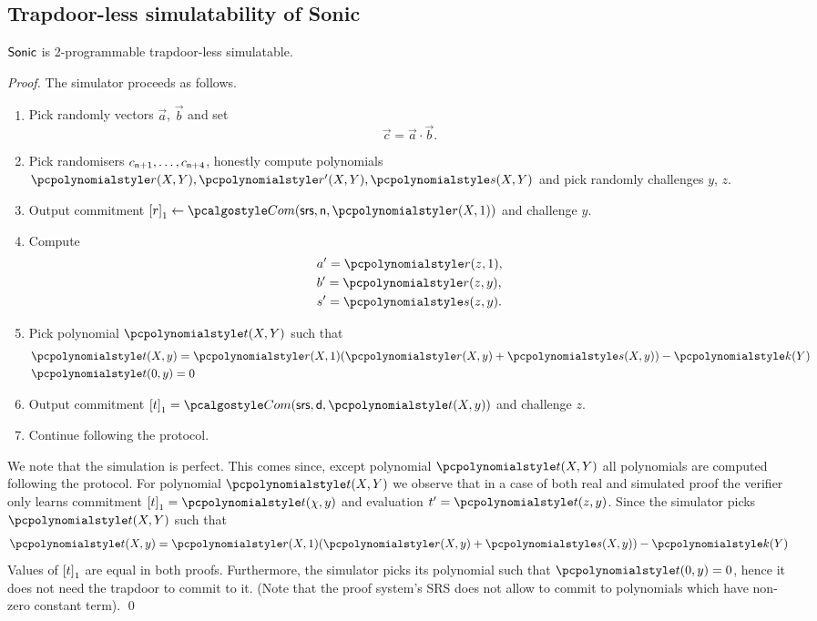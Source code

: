 \subsection{Trapdoor-less simulatability of Sonic}
\begin{lemma}
\label{lem:sonic_hvzk}
${\textnormal{\textsf{Sonic}}}$ is 2-programmable trapdoor-less simulatable.
\end{lemma}
\begin{proof}
  The simulator proceeds as follows.
  \begin{enumerate}
  \item Pick randomly vectors $\vec{a}$, $\vec{b}$ and set
    \begin{equation}
      \label{eq:ab_eq_c}
      \vec{c} = \vec{a} \cdot \vec{b}. 
    \end{equation}
  \item Pick randomisers $c_{\mathsf{n} + 1}, \ldots, c_{\mathsf{n} + 4}$,
    honestly compute polynomials $\p{r}(X, Y), \p{r'}(X, Y), \p{s}(X, Y)$ and
    pick randomly challenges $y$, $z$.
  \item Output commitment $\gone{r} \gets \com(\srs, \multconstr, \p{r} (X,
    1))$ and challenge $y$. 
  \item Compute
    \begin{align*}
      & a' = \p{r}(z, 1),\\
      & b' = \p{r}(z, y),\\
      & s' = \p{s}(z, y).
    \end{align*} 
  \item Pick polynomial $\p{t}(X, Y)$ such that
    \begin{align*}
      & \p{t} (X, y) = \p{r} (X, 1) (\p{r}(X, y) + \p{s} (X, y)) - \p{k} (Y)\\
      & \p{t} (0, y) = 0
    \end{align*}
  \item Output commitment $\gone{t} = \com (\srs, \dconst, \p{t} (X, y))$ and
    challenge $z$.
  \item Continue following the protocol.
  \end{enumerate}

  We note that the simulation is perfect. This comes since, except polynomial
  $\p{t} (X, Y)$ all polynomials are computed following the protocol. For
  polynomial $\p{t} (X, Y)$ we observe that in a case of both real and simulated
  proof the verifier only learns commitment $\gone{t} = \p{t} (\chi, y)$ and
  evaluation $t' = \p{t} (z, y)$. Since the simulator picks $\p{t} (X, Y)$ such
  that 
  \begin{align*}
      \p{t} (X, y) = \p{r} (X, 1) (\p{r}(X, y) + \p{s} (X, y)) - \p{k} (Y)
  \end{align*}
  Values of $\left[t\right]_{1}$ are equal in both proofs.
  Furthermore, the simulator picks its polynomial such that $\p{t}(0, y) = 0$,
  hence it does not need the trapdoor to commit to it. (Note that the proof
  system's SRS does not allow to commit to polynomials which have non-zero
  constant term). \qed
\end{proof}
